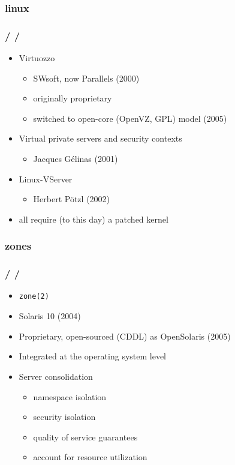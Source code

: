 \documentclass{beamer}
\newcommand{\autotitle}
{\frametitle{
    \secname
    \ifx\insertsubsection\empty
    \else
        /\subsecname
        \ifx\insertsubsubsection\empty\else/\subsubsecname\fi
    \fi}}
\begin{document}
\subsubsection{linux}

\begin{frame}
    \autotitle
    \begin{itemize}
        \item Virtuozzo
        \begin{itemize}
            \item SWsoft, now Parallels (2000)
            \item originally proprietary
            \item
                switched to open-core (OpenVZ, GPL) model (2005) \cite{openvz}
        \end{itemize}
        \item Virtual private servers and security contexts
        \begin{itemize}
            \item Jacques Gélinas (2001) \cite{virtual_private_servers}
        \end{itemize}
        \item Linux-VServer
        \begin{itemize}
            \item Herbert Pötzl (2002) \cite{linux_vserver}
        \end{itemize}
        \item all require (to this day) a patched kernel
    \end{itemize}
\end{frame}

\subsubsection{zones}

\begin{frame}
    \autotitle
    \begin{itemize}
        \item \texttt{zone(2)}
        \item Solaris 10 (2004)
        \item Proprietary, open-sourced (CDDL) as OpenSolaris (2005)
        \item Integrated at the operating system level
        \item Server consolidation
        \begin{itemize}
            \item namespace isolation
            \item security isolation
            \item quality of service guarantees
            \item account for resource utilization
        \end{itemize}
    \end{itemize}
\end{frame}
\end{document}
